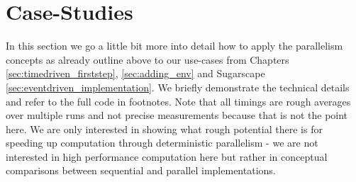 \section{Case-Studies}
In this section we go a little bit more into detail how to apply the parallelism concepts as already outline above to our use-cases from Chapters \ref{sec:timedriven_firststep}, \ref{sec:adding_env} and Sugarscape \ref{sec:eventdriven_implementation}. We briefly demonstrate the technical details and refer to the full code in footnotes. Note that all timings are rough averages over multiple runs and not precise measurements because that is not the point here. We are only interested in showing what rough potential there is for speeding up computation through deterministic parallelism - we are not interested in high performance computation here but rather in conceptual comparisons between sequential and parallel implementations.




\\
